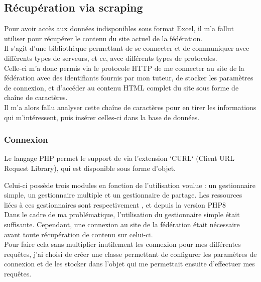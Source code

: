\subsection{Récupération via scraping}
\vspace{1cm}

Pour avoir accès aux données indisponibles sous format Excel, il m’a fallut utiliser  pour récupérer le contenu du site actuel de la fédération.\\

Il s’agit d’une bibliothèque permettant de se connecter et de communiquer avec différents types de serveurs, et ce, avec différents types de protocoles. \\

Celle-ci m’a donc permis via le protocole HTTP de me connecter au site de la fédération avec des identifiants fournis par mon tuteur, de stocker les paramètres de connexion, et d’accéder au contenu HTML complet du site sous forme de chaîne de caractères.\\

Il m’a alors fallu analyser cette chaîne de caractères pour en tirer les informations qui m’intéressent, puis insérer celles-ci dans la base de données.

\subsubsection{Connexion}
\vspace{1cm}

Le langage PHP permet le support de  via l’extension `CURL` (Client URL Request Library), qui est disponible sous forme d’objet.

Celui-ci possède trois modules en fonction de l’utilisation voulue : un gestionnaire simple, un gestionnaire multiple et un gestionnaire de partage. Les ressources liées à ces gestionnaires sont respectivement ,  et  depuis la version PHP8 \\

Dans le cadre de ma problématique, l’utilisation du gestionnaire simple était suffisante. Cependant, une connexion au site de la fédération était nécessaire avant toute récupération de contenu sur celui-ci. \\

Pour faire cela sans multiplier inutilement les connexion pour mes différentes requêtes, j’ai choisi de créer une classe permettant de configurer les paramètres de connexion et de les stocker dans l’objet  qui me permettait ensuite d’effectuer mes requêtes.

